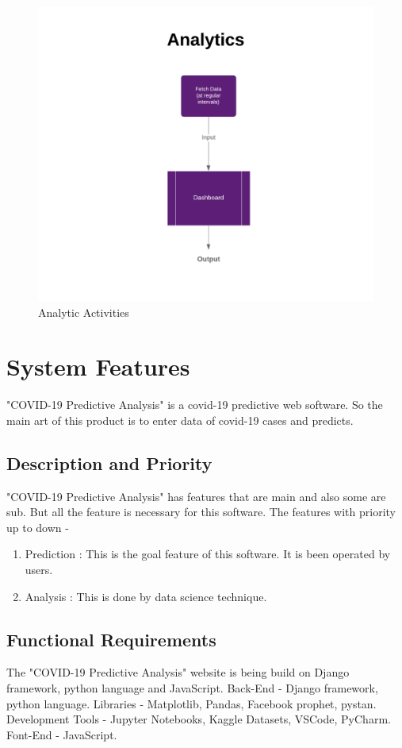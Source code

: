 \documentclass{scrreprt}
\begin{document}
\begin{figure}[h!]
    \centering
    \includegraphics[width=15cm]{COVID-19 Predictive Analysis (1).png}
    \caption{Analytic Activities}
    \label{fig:Analytic Activities}
\end{figure}

\chapter{System Features}
"COVID-19 Predictive Analysis" is a covid-19 predictive web software. So the main art of this product is to enter data of covid-19 cases and predicts. 

\section{Description and Priority}
"COVID-19 Predictive Analysis" has features that are main and also some are sub. But all the feature is necessary for this software.
\newline
The features with priority up to down - 
\begin{enumerate}
    \item Prediction : This is the goal feature of this software. It is been operated by users.
    \item Analysis : This is done by data science technique.
\end{enumerate}

\section{Functional Requirements}
The "COVID-19 Predictive Analysis" website is being build on Django framework, python language and JavaScript.
\newline
Back-End - Django framework, python language.
\newline
Libraries - Matplotlib, Pandas, Facebook prophet, pystan.
\newline
Development Tools - Jupyter Notebooks, Kaggle Datasets, VSCode, PyCharm.
\newline
Font-End - JavaScript.
\end{document}
